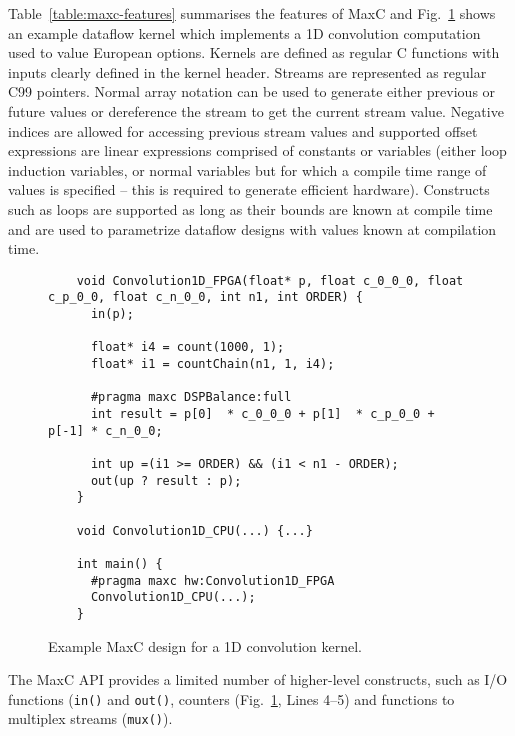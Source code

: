 Table~\ref{table:maxc-features} summarises the features of MaxC and
Fig.~\ref{fig:maxc-1dconv} shows an example dataflow kernel which
implements a 1D convolution computation used to value European
options.  Kernels are defined as regular C functions with inputs
clearly defined in the kernel header. Streams are represented as
regular C99 pointers.  Normal array notation can be used to generate
either previous or future values or dereference the stream to get the
current stream value. Negative indices are allowed for accessing
previous stream values and supported offset expressions are linear
expressions comprised of constants or variables (either loop induction
variables, or normal variables but for which a compile time range of
values is specified -- this is required to generate efficient
hardware). Constructs such as loops are supported as long as their
bounds are known at compile time and are used to parametrize dataflow
designs with values known at compilation time.

\lstset{style=MaxC}

\begin{figure}[!h]
  \begin{lstlisting}
    void Convolution1D_FPGA(float* p, float c_0_0_0, float c_p_0_0, float c_n_0_0, int n1, int ORDER) {
      in(p);

      float* i4 = count(1000, 1);
      float* i1 = countChain(n1, 1, i4);

      #pragma maxc DSPBalance:full
      int result = p[0]  * c_0_0_0 + p[1]  * c_p_0_0 + p[-1] * c_n_0_0;

      int up =(i1 >= ORDER) && (i1 < n1 - ORDER);
      out(up ? result : p);
    }

    void Convolution1D_CPU(...) {...}

    int main() {
      #pragma maxc hw:Convolution1D_FPGA
      Convolution1D_CPU(...);
    }
  \end{lstlisting}
  \caption{Example MaxC design for a 1D convolution kernel.}
  \label{fig:maxc-1dconv}
\end{figure}


The MaxC API provides a limited number of higher-level constructs, such as I/O
functions (\texttt{in()} and \texttt{out()}, counters (Fig.~\ref{fig:maxc-1dconv},
Lines 4--5) and functions to multiplex streams (\texttt{mux()}).
